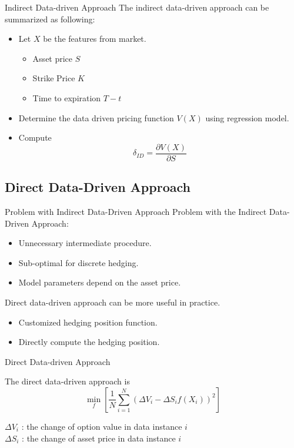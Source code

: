 \documentclass[10pt,table,mathserif]{beamer}
\begin{document}
\begin{frame}{Indirect Data-driven Approach}
The indirect data-driven approach \footnotemark can be summarized as following:
\begin{itemize}
\item Let $X$ be the features from market.
\begin{itemize}
  \item Asset price $S$
  \item Strike Price $K$
  \item Time to expiration $T-t$
\end{itemize}
\item Determine the data driven pricing function $V(X)$ using regression model.
\item Compute
\[
\delta_{ID}=\frac{ \partial V(X) }{ \partial S}
\]
\end{itemize}
\end{frame}

\subsection{Direct Data-Driven Approach}
\begin{frame}{Problem with Indirect Data-Driven Approach}
Problem with the Indirect Data-Driven Approach:
\begin{itemize}
  \item Unnecessary intermediate procedure.
  \item Sub-optimal for discrete hedging.
  \item Model parameters depend on the asset price.
\end{itemize}

Direct data-driven approach can be more useful in practice.
\begin{itemize}
  \item Customized hedging position function.
  \item Directly compute the hedging position.
\end{itemize}
\end{frame}

\begin{frame}{Direct Data-driven Approach}

The direct data-driven approach is
\[
\min_{f}\left[\frac{1}{N} \sum_{i=1}^N (\Delta V_i-\Delta S_i f(X_i))^2 \right]
\]

\begin{center}
$\Delta V_i$ : the change of option value in data instance $i$\\
$\Delta S_i$ : the change of asset price in data instance $i$ \\
\end{center}
\end{frame}
\end{document}

